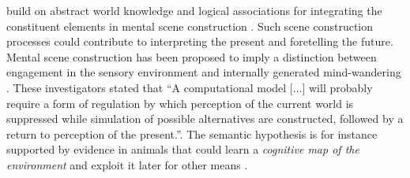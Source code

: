 \documentclass[10pt,letterpaper]{article}
\begin{document}
build on abstract world knowledge and logical associations
for integrating the constituent elements in mental scene construction
\citep{schacter2007remembering}.
Such scene construction processes could contribute to interpreting the
present and foretelling the future.
Mental scene construction has been proposed
to imply a distinction between
engagement in the sensory environment
and internally generated mind-wandering
\citep{buckner2007self}.
These investigators stated that
``A computational model [...] will probably require a form of
regulation by which perception of the current world is suppressed
while simulation of possible alternatives are constructed,
followed by a return to perception of the present.''.
The semantic hypothesis is for instance supported by evidence in animals that
could learn a \textit{cognitive map of the environment}
and exploit it later for other means \citep{tolman1948cognitive}.
\end{document}
